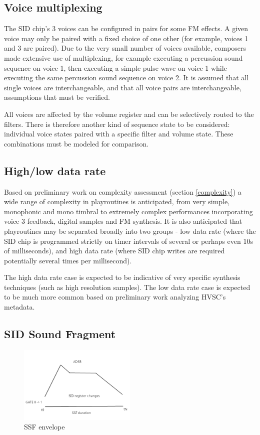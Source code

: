 \documentclass[10pt]{article}
\begin{document}
\begin{multicols*}{2}
\subsection{Voice multiplexing}

The SID chip's 3 voices can be configured in pairs for some FM effects. A given voice may only be paired with a fixed choice of one other (for example, voices 1 and 3 are paired). Due to the very small number of voices available, composers made extensive use of multiplexing, for example executing a percussion sound sequence on voice 1, then executing a simple pulse wave on voice 1 while executing the same percussion sound sequence on voice 2. It is assumed that all single voices are interchangeable, and that all voice pairs are interchangeable, assumptions that must be verified.

All voices are affected by the volume register and can be selectively routed to the filters. There is therefore another kind of sequence state to be considered: individual voice states paired with a specific filter and volume state. These combinations must be modeled for comparison.

\subsection{High/low data rate}

Based on preliminary work on complexity assessment (section \ref{complexity}) a wide range of complexity in playroutines is anticipated, from very simple, monophonic and mono timbral to extremely complex performances incorporating voice 3 feedback, digital samples and FM synthesis. It is also anticipated that playroutines may be separated broadly into two groups - low data rate (where the SID chip is programmed strictly on timer intervals of several or perhaps even 10s of milliseconds), and high data rate (where SID chip writes are required potentially several times per millisecond).

The high data rate case is expected to be indicative of very specific synthesis techniques (such as high resolution samples). The low data rate case is expected to be much more common based on preliminary work analyzing HVSC’s metadata.

\subsection{SID Sound Fragment}
\label{ssf}

\begin{figure}[H]
\includegraphics[width=0.5\textwidth]{ssf}
\caption{SSF envelope}
\end{figure}


\end{multicols*}
\end{document}
